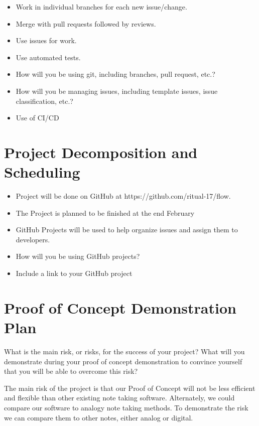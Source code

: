 \documentclass{article}
\begin{document}
\begin{itemize}

	\item Work in individual branches for each new issue/change. 
	\item Merge with pull requests followed by reviews.
	\item Use issues for work.
	\item Use automated tests. 
	\item How will you be using git, including branches, pull request, etc.?
	\item How will you be managing issues, including template issues, issue
	classification, etc.?
  \item Use of CI/CD
\end{itemize}

\section{Project Decomposition and Scheduling}

\begin{itemize}
  \item Project will be done on GitHub at https://github.com/ritual-17/flow.
  \item The Project is planned to be finished at the end February 
  \item GitHub Projects will be used to help organize issues and assign them to developers. 
  \item How will you be using GitHub projects?
  
  \item Include a link to your GitHub project
  
\end{itemize}


\section{Proof of Concept Demonstration Plan}

What is the main risk, or risks, for the success of your project?  What will you
demonstrate during your proof of concept demonstration to convince yourself that
you will be able to overcome this risk?

The main risk of the project is that our Proof of Concept will not be less efficient and flexible than other existing note taking software. Alternately, we could compare our software to analogy note taking methods. To demonstrate the risk we can compare them to other notes, either analog or digital. 
\end{document}
